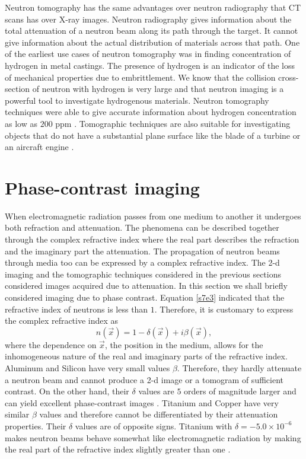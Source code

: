 \documentclass{article}
\numberwithin{equation}{section}
\begin{document}
Neutron tomography has the same advantages over neutron radiography that CT
scans has over X-ray images. Neutron radiography gives information about the
total attenuation of a neutron beam along its path through the target. It 
cannot give information about the actual distribution of materials across that
path. One of the earliest use cases of neutron tomography was in finding 
concentration of hydrogen in metal castings. The presence of hydrogen is an
indicator of the loss of mechanical properties due to embrittlement. We know
that the collision cross-section of neutron with hydrogen is very large and
that neutron imaging is a powerful tool to investigate hydrogenous materials. 
Neutron tomography techniques were able to give accurate information 
about hydrogen concentration as low as $200$ ppm \cite{richards2004neutron}.
Tomographic techniques are also suitable for investigating objects that do not
have a substantial plane surface like the blade of a turbine or an aircraft 
engine \cite{richards2004neutron}.

\section{Phase-contrast imaging}\label{s10}
When electromagnetic radiation passes from one medium to another it undergoes
both refraction and attenuation. The phenomena can be described together 
through the complex refractive index \cite{heald2012classical} where the
real part describes the refraction and the imaginary part the attenuation. 
The propagation of neutron beams through media too can be expressed by a 
complex refractive index. The 2-d imaging and the tomographic techniques
considered in the previous sections considered images acquired due to 
attenuation. In this section we shall briefly considered imaging due to phase
contrast. Equation \eqref{s7e3} indicated that the refractive index of neutrons
is less than $1$. Therefore, it is customary to express the complex refractive
index as
\begin{equation}\label{s10e1}
n(\vec{x}) = 1 - \delta(\vec{x}) + i\beta(\vec{x}),
\end{equation}
where the dependence on $\vec{x}$, the position in the medium, allows for the
inhomogeneous nature of the real and imaginary parts of the refractive index.
Aluminum and Silicon have very small values $\beta$. Therefore, they hardly
attenuate a neutron beam and cannot produce a 2-d image or a tomogram of 
sufficient contrast. On the other hand, their $\delta$ values are $5$ orders
of magnitude larger and can yield excellent phase-contrast images 
\cite{anderson2008neutron}. Titanium and Copper have very similar $\beta$
values and therefore cannot be differentiated by their attenuation properties.
Their $\delta$ values are of opposite signs. Titanium with $\delta=-5.0 \times
10^{-6}$ makes neutron beams behave somewhat like electromagnetic radiation
by making the real part of the refractive index slightly greater than one
\cite{anderson2008neutron}.
\end{document}

